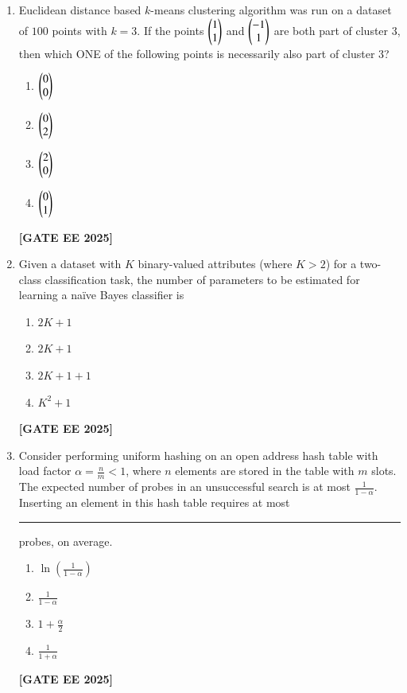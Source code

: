 \documentclass[journal]{IEEEtran}
\newcommand{\qfooter}{%
  \begin{flushright}\footnotesize\textbf{[GATE EE 2025]}\end{flushright}\vspace{1em}%
}
\begin{document}
\begin{enumerate}[leftmargin=*,label=\arabic*.]
\item Euclidean distance based $k$-means clustering algorithm was run on a dataset of $100$ points with $k=3$. If the points $\begin{pmatrix}1\\1\end{pmatrix}$ and $\begin{pmatrix}-1\\1\end{pmatrix}$ are both part of cluster 3, then which ONE of the following points is necessarily also part of cluster 3?
\begin{multicols}{4}
\begin{enumerate}[label=(\Alph*)]
\item $\begin{pmatrix}0\\0\end{pmatrix}$
\item $\begin{pmatrix}0\\2\end{pmatrix}$
\item $\begin{pmatrix}2\\0\end{pmatrix}$
\item $\begin{pmatrix}0\\1\end{pmatrix}$
\end{enumerate} 
\qfooter
\end{multicols}

\item Given a dataset with $K$ binary-valued attributes (where $K > 2$) for a two-class classification task, the number of parameters to be estimated for learning a na\"ive Bayes classifier is
\begin{multicols}{2}
\begin{enumerate}[label=(\Alph*)]
\item $2K+1$
\item $2K+1$
\item $2K+1+1$
\item $K^2+1$
\end{enumerate} \qfooter
\end{multicols}


\item Consider performing uniform hashing on an open address hash table with load factor $\alpha = \frac{n}{m} < 1$, where $n$ elements are stored in the table with $m$ slots. The expected number of probes in an unsuccessful search is at most $\frac{1}{1-\alpha}$. Inserting an element in this hash table requires at most \rule{8em}{0.07em} probes, on average.
\begin{multicols}{2}
\begin{enumerate}[label=(\Alph*)]
\item $\ln\left(\frac{1}{1-\alpha}\right)$
\item $\frac{1}{1-\alpha}$
\item $1+\frac{\alpha}{2}$
\item $\frac{1}{1+\alpha}$
\end{enumerate} \qfooter
\end{multicols}


\end{enumerate}
\end{document}

